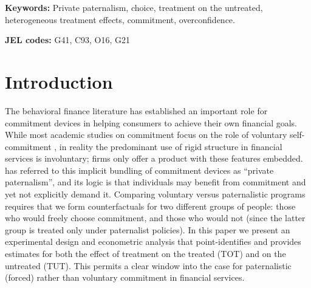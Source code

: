 \documentclass[12pt, a4paper]{article}
\begin{document}
\textbf{Keywords: } Private paternalism, choice, treatment on the untreated, heterogeneous treatment effects, commitment, overconfidence.

\textbf{JEL codes:} G41, C93, O16, G21




\section{Introduction}

The behavioral finance literature has established an important role for commitment devices in helping consumers to achieve their own financial goals.  While most academic studies on commitment focus on the role of voluntary self-commitment \citep{thaler2004save, prina2015banking, brune2016facilitating, callen2019headwaters, Pascaline, Ashraf}, in reality the predominant use of rigid structure in financial services is involuntary; firms only offer a product with these features embedded.  \cite{Laibson2018} has referred to this implicit bundling of commitment devices as ``private paternalism'', and its logic is that individuals may benefit from commitment and yet not explicitly demand it.  Comparing voluntary versus paternalistic programs requires that we form counterfactuals for two different groups of people: those who would freely choose commitment, and those who would not (since the latter group is treated only under paternalist policies). In this paper we present an experimental design and econometric analysis that point-identifies and provides estimates for both the effect of treatment on the treated (TOT) and on the untreated (TUT). This permits a clear window into the case for paternalistic (forced) rather than voluntary commitment in financial services.
\end{document}
